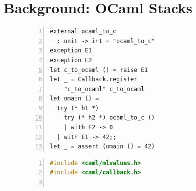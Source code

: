 \documentclass[sigplan,screen]{acmart}
\begin{document}
\section{Background: OCaml Stacks}
\label{sec:stack}

\begin{figure}
\begin{minipage}{0.30\linewidth}
  \begin{minipage}{\linewidth}
    \begin{lstlisting}[numbers=left]
external ocaml_to_c
  : unit -> int = "ocaml_to_c"
exception E1
exception E2
let c_to_ocaml () = raise E1
let _ = Callback.register
    "c_to_ocaml" c_to_ocaml
let omain () =
  try (* h1 *)
    try (* h2 *) ocaml_to_c ()
    | with E2 -> 0
  | with E1 -> 42;;
let _ = assert (omain () = 42)
    \end{lstlisting}
    \label{code:meander_ml}
  \end{minipage}
  \begin{minipage}{\linewidth}
    \begin{lstlisting}[language=c,numbers=left]
#include <caml/mlvalues.h>
#include <caml/callback.h>


\end{lstlisting}
\end{minipage}
\end{minipage}
\end{figure}
\end{document}
